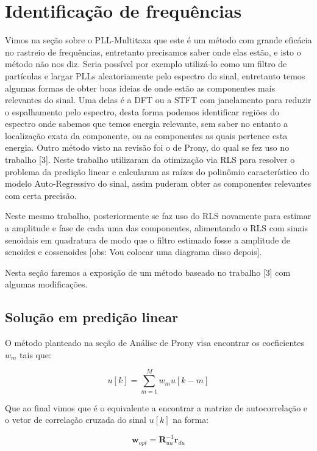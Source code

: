 \documentclass[a4paper, 12pt]{book}
\begin{document}
\section{Identificação de frequências}

\indent Vimos na seção sobre o PLL-Multitaxa que este é um método com grande eficácia no rastreio de frequências, entretanto precisamos saber onde elas estão, e isto o método não nos diz. Seria possível por exemplo utilizá-lo como um filtro de partículas e largar PLLs aleatoriamente pelo espectro do sinal, entretanto temos algumas formas de obter boas ideias de onde estão as componentes mais relevantes do sinal. Uma delas é a DFT ou a STFT com janelamento para reduzir o espalhamento pelo espectro, desta forma podemos identificar regiões do espectro onde sabemos que temos energia relevante, sem saber no entanto a localização exata da componente, ou as componentes as quais pertence esta energia. Outro método visto na revisão foi o de Prony, do qual se fez uso no trabalho [3]. Neste trabalho utilizaram da otimização via RLS para resolver o problema da predição linear e calcularam as raízes do polinômio característico do modelo Auto-Regressivo do sinal, assim puderam obter as componentes relevantes com certa precisão.

\indent Neste mesmo trabalho, posteriormente se faz uso do RLS novamente para estimar a amplitude e fase de cada uma das componentes, alimentando o RLS com sinais senoidais em quadratura de modo que o filtro estimado fosse a amplitude de senoides e cossenoides [obs: Vou colocar uma diagrama disso depois]. 

\indent Nesta seção faremos a exposição de um método baseado no trabalho [3] com algumas modificações.

\subsection{Solução em predição linear}

O método planteado na seção de Análise de Prony visa encontrar os coeficientes $w_m$ tais que:

\begin{equation}
u[k]=\sum_{m=1}^{M}w_m u[k-m]
\end{equation}

Que ao final vimos que é o equivalente a encontrar a matrize de autocorrelação e o vetor de correlação cruzada do sinal $u[k]$ na forma:

\begin{equation}
\boldsymbol{w}_{opt}=\boldsymbol{R}_{uu}^{-1}\boldsymbol{r}_{du}
\end{equation}
\end{document}
